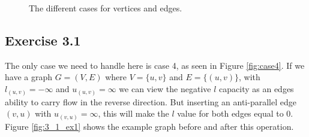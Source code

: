 \begin{figure}[H]
\begin{minipage}{.22\textwidth}
\label{fig:case3}
\end{minipage}%
\quad
\begin{minipage}{.22\textwidth}
\centering
{}
\label{fig:case4}
\end{minipage}%


\caption{The different cases for vertices and edges.}
\label{fig:cases}
\end{figure}

\subsection{Exercise 3.1}
The only case we need to handle here is case 4, as seen in Figure
\ref{fig:case4}.  If we have a graph $G=(V,E)$ where $V=\{u,v\}$ and
$E=\{(u,v)\}$, with $l_{(u,v)} = -\infty$ and $u_{(u,v)}=\infty$ we can view the
negative $l$ capacity as an edges ability to carry flow in the reverse
direction. But inserting an anti-parallel edge $(v,u)$ with $u_{(v,u)} =
\infty$, this will make the $l$ value for both edges equal to 0. Figure
\ref{fig:3_1_ex1} shows the example graph before and after this operation.

